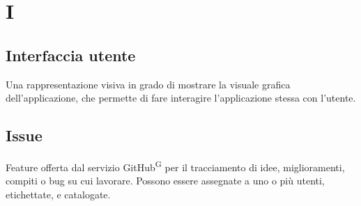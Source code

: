 \section{I}

\subsection{Interfaccia utente} Una rappresentazione visiva in grado di mostrare la visuale grafica dell’applicazione, che permette di fare interagire l’applicazione stessa con l’utente.

\subsection{Issue}
Feature offerta dal servizio GitHub\textsuperscript{G} per il tracciamento di idee, miglioramenti, compiti o bug su cui lavorare. Possono essere assegnate a uno o più utenti, etichettate, e catalogate.

\clearpage
